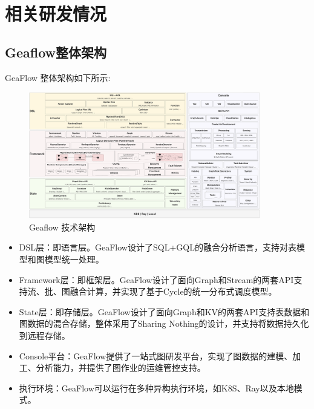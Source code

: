 \section{相关研发情况}
\subsection{Geaflow整体架构}
GeaFlow 整体架构如下所示:
\begin{figure}[H]
  \begin{center}
    \includegraphics[width=0.90\textwidth]{./figures/geaflow_arch_new.png}
  \end{center}
  \caption{Geaflow 技术架构}
\end{figure}

\begin{itemize}
  \item DSL层：即语言层。GeaFlow设计了SQL+GQL的融合分析语言，支持对表模型和图模型统一处理。
  \item Framework层：即框架层。GeaFlow设计了面向Graph和Stream的两套API支持流、批、图融合计算，并实现了基于Cycle的统一分布式调度模型。
  \item State层：即存储层。GeaFlow设计了面向Graph和KV的两套API支持表数据和图数据的混合存储，整体采用了Sharing Nothing的设计，并支持将数据持久化到远程存储。
  \item Console平台：GeaFlow提供了一站式图研发平台，实现了图数据的建模、加工、分析能力，并提供了图作业的运维管控支持。
  \item 执行环境：GeaFlow可以运行在多种异构执行环境，如K8S、Ray以及本地模式。
\end{itemize}

